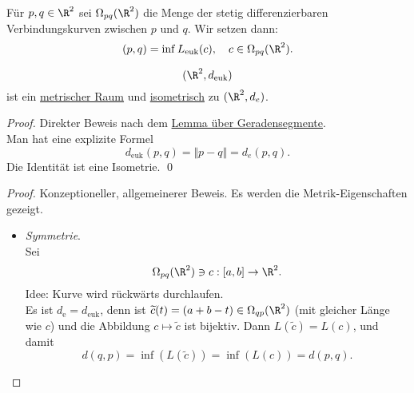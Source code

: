 \begin{definition}
  Für \( p,q \in \R^2 \) sei \( \Omega_{pq}(\R^2) \) die Menge der stetig differenzierbaren Verbindungskurven zwischen \( p \) und \( q \). Wir setzen dann:
  \begin{equation*}
    (p,q) = \inf L_\text{euk}(c), \quad c \in \Omega_{pq}(\R^2)\text{.}
  \end{equation*}
\end{definition}

\begin{theorem}
  \begin{equation*}
    (\R^2, d_\text{euk})
  \end{equation*}
  ist ein \hyperref[def:metrischerRaum]{metrischer Raum} und \hyperref[def:isometrie]{isometrisch} zu \( (\R^2, d_e) \).
  \begin{proof}
    Direkter Beweis nach dem \hyperref[lemma:geradenkurz]{Lemma über Geradensegmente}. \\
    Man hat eine explizite Formel
    \begin{equation*}
      d_{\text{euk}}(p,q) = \Vert p - q \Vert = d_e(p,q)\text{.}
    \end{equation*}
    Die Identität ist eine Isometrie. \qed{}
  \end{proof}
  \begin{proof}
    Konzeptioneller, allgemeinerer Beweis. Es werden die Metrik-Eigenschaften gezeigt.

    \begin{itemize}
      \item \emph{Symmetrie}. \\
        Sei
        \begin{equation*}
          \Omega_{pq}(\R^2) \ni c: [a,b] \to \R^2\text{.}
       \end{equation*}
       Idee: Kurve wird rückwärts durchlaufen. \\
       Es ist \( d_\text{e} = d_\text{euk} \), denn ist \( \widetilde{c}(t) = (a+b-t) \in \Omega_{qp}(\R^2) \) (mit gleicher Länge wie \( c \)) und die Abbildung \( c \mapsto \widetilde{c} \) ist bijektiv. Dann \( L(\widetilde{c}) = L(c) \), und damit
       \begin{equation*}
         d(q,p) = \inf(L(\widetilde{c})) = \inf(L(c)) = d(p,q)\text{.}
       \end{equation*}


\end{itemize}
\end{proof}
\end{theorem}
